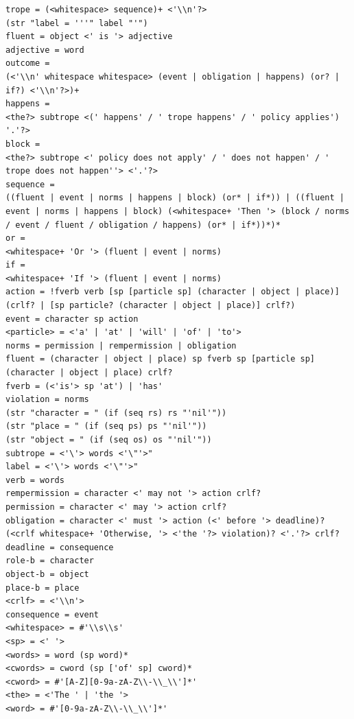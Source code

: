 \documentclass[11pt]{report}
\begin{document}
\begin{lstlisting}[showstringspaces=false,label={lst:ebnf2},caption={EBNF
grammar for the main trope definitions in TropICAL}]
trope = (<whitespace> sequence)+ <'\\n'?>
(str "label = '''" label "'")
fluent = object <' is '> adjective
adjective = word
outcome =
(<'\\n' whitespace whitespace> (event | obligation | happens) (or? | if?) <'\\n'?>)+
happens =
<the?> subtrope <(' happens' / ' trope happens' / ' policy applies') '.'?>
block =
<the?> subtrope <' policy does not apply' / ' does not happen' / ' trope does not happen''> <'.'?>
sequence =
((fluent | event | norms | happens | block) (or* | if*)) | ((fluent | event | norms | happens | block) (<whitespace+ 'Then '> (block / norms / event / fluent / obligation / happens) (or* | if*))*)*
or =
<whitespace+ 'Or '> (fluent | event | norms)
if =
<whitespace+ 'If '> (fluent | event | norms)
action = !fverb verb [sp [particle sp] (character | object | place)] (crlf? | [sp particle? (character | object | place)] crlf?)
event = character sp action
<particle> = <'a' | 'at' | 'will' | 'of' | 'to'>
norms = permission | rempermission | obligation
fluent = (character | object | place) sp fverb sp [particle sp] (character | object | place) crlf?
fverb = (<'is'> sp 'at') | 'has'
violation = norms
(str "character = " (if (seq rs) rs "'nil'"))
(str "place = " (if (seq ps) ps "'nil'"))
(str "object = " (if (seq os) os "'nil'"))
subtrope = <'\'> words <'\"'>"
label = <'\'> words <'\"'>"
verb = words
rempermission = character <' may not '> action crlf?
permission = character <' may '> action crlf?
obligation = character <' must '> action (<' before '> deadline)? (<crlf whitespace+ 'Otherwise, '> <'the '?> violation)? <'.'?> crlf?
deadline = consequence
role-b = character
object-b = object
place-b = place
<crlf> = <'\\n'>
consequence = event
<whitespace> = #'\\s\\s'
<sp> = <' '>
<words> = word (sp word)*
<cwords> = cword (sp ['of' sp] cword)*
<cword> = #'[A-Z][0-9a-zA-Z\\-\\_\\']*'
<the> = <'The ' | 'the '>
<word> = #'[0-9a-zA-Z\\-\\_\\']*'
\end{lstlisting}
\end{document}
